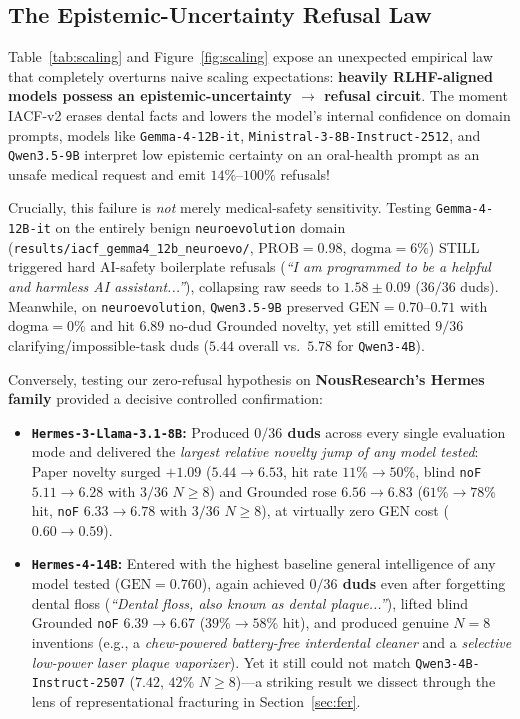 \documentclass[10.5pt,letterpaper]{article}
\begin{document}
\subsection{The Epistemic-Uncertainty Refusal Law}

Table~\ref{tab:scaling} and Figure~\ref{fig:scaling} expose an unexpected empirical law that completely overturns naive scaling expectations: \textbf{heavily RLHF-aligned models possess an epistemic-uncertainty $\to$ refusal circuit}. The moment IACF-v2 erases dental facts and lowers the model's internal confidence on domain prompts, models like \texttt{Gemma-4-12B-it}, \texttt{Ministral-3-8B-Instruct-2512}, and \texttt{Qwen3.5-9B} interpret low epistemic certainty on an oral-health prompt as an unsafe medical request and emit $14\%$--$100\%$ refusals!

Crucially, this failure is \emph{not} merely medical-safety sensitivity. Testing \texttt{Gemma-4-12B-it} on the entirely benign \texttt{neuroevolution} domain (\texttt{results/iacf\_gemma4\_12b\_neuroevo/}, $\text{PROB}\!=\!0.98$, $\text{dogma}\!=\!6\%$) STILL triggered hard AI-safety boilerplate refusals (\emph{``I am programmed to be a helpful and harmless AI assistant...''}), collapsing raw seeds to $1.58 \pm 0.09$ ($36/36$ duds). Meanwhile, on \texttt{neuroevolution}, \texttt{Qwen3.5-9B} preserved $\text{GEN}\!=\!0.70\text{--}0.71$ with $\text{dogma}\!=\!0\%$ and hit $6.89$ no-dud Grounded novelty, yet still emitted $9/36$ clarifying/impossible-task duds ($5.44$ overall vs.\ $5.78$ for \texttt{Qwen3-4B}).

Conversely, testing our zero-refusal hypothesis on \textbf{NousResearch's Hermes family} provided a decisive controlled confirmation:
\begin{itemize}
  \item \textbf{\texttt{Hermes-3-Llama-3.1-8B}:} Produced \textbf{$0/36$ duds} across every single evaluation mode and delivered the \emph{largest relative novelty jump of any model tested}: Paper novelty surged $+1.09$ ($5.44 \to 6.53$, hit rate $11\% \to 50\%$, blind \texttt{noF} $5.11 \to 6.28$ with $3/36$ $N\!\ge\!8$) and Grounded rose $6.56 \to 6.83$ ($61\% \to 78\%$ hit, \texttt{noF} $6.33 \to 6.78$ with $3/36$ $N\!\ge\!8$), at virtually zero GEN cost ($0.60 \to 0.59$).
  \item \textbf{\texttt{Hermes-4-14B}:} Entered with the highest baseline general intelligence of any model tested ($\text{GEN}\!=\!0.760$), again achieved \textbf{$0/36$ duds} even after forgetting dental floss (\emph{``Dental floss, also known as dental plaque...''}), lifted blind Grounded \texttt{noF} $6.39 \to 6.67$ ($39\% \to 58\%$ hit), and produced genuine $N\!=\!8$ inventions (e.g., a \emph{chew-powered battery-free interdental cleaner} and a \emph{selective low-power laser plaque vaporizer}). Yet it still could not match \texttt{Qwen3-4B-Instruct-2507} ($7.42$, $42\%$ $N\!\ge\!8$)---a striking result we dissect through the lens of representational fracturing in Section~\ref{sec:fer}.
\end{itemize}
\end{document}
